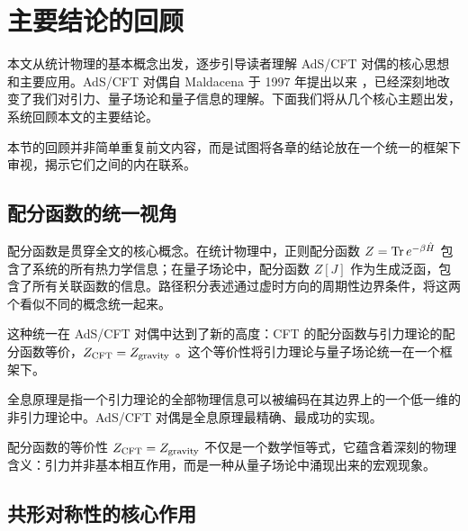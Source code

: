 

\section{主要结论的回顾}

本文从统计物理的基本概念出发，逐步引导读者理解 AdS/CFT 对偶的核心思想和主要应用。AdS/CFT 对偶自 Maldacena 于 1997 年提出以来 \cite{Maldacena1997}，已经深刻地改变了我们对引力、量子场论和量子信息的理解。下面我们将从几个核心主题出发，系统回顾本文的主要结论。

\begin{note}
本节的回顾并非简单重复前文内容，而是试图将各章的结论放在一个统一的框架下审视，揭示它们之间的内在联系。
\end{note}

\subsection{配分函数的统一视角}

配分函数是贯穿全文的核心概念。在统计物理中，正则配分函数 $Z = \Tr e^{-\beta \hat{H}}$ 包含了系统的所有热力学信息；在量子场论中，配分函数 $Z[J]$ 作为生成泛函，包含了所有关联函数的信息。路径积分表述通过虚时方向的周期性边界条件，将这两个看似不同的概念统一起来。

这种统一在 AdS/CFT 对偶中达到了新的高度：CFT 的配分函数与引力理论的配分函数等价，$Z_{\rm CFT} = Z_{\rm gravity}$ \cite{Maldacena1997, Gubser1998, Witten1998}。这个等价性将引力理论与量子场论统一在一个框架下。

\begin{definition}[全息原理]
全息原理是指一个引力理论的全部物理信息可以被编码在其边界上的一个低一维的非引力理论中。AdS/CFT 对偶是全息原理最精确、最成功的实现。
\end{definition}

\begin{remark}
配分函数的等价性 $Z_{\rm CFT} = Z_{\rm gravity}$ 不仅是一个数学恒等式，它蕴含着深刻的物理含义：引力并非基本相互作用，而是一种从量子场论中涌现出来的宏观现象。
\end{remark}

\subsection{共形对称性的核心作用}

